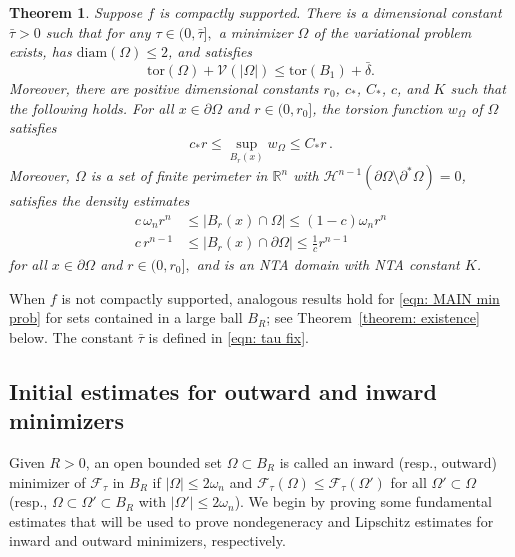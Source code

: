 \documentclass[10pt, reqno]{amsart}
\numberwithin{equation}{section}
\newtheorem{theorem}{Theorem}[section]
\def\R{{\mathbb R}}
\def\W{\Omega}
\def\om{\omega}
\def\tor{\mathrm{tor}}
\def\fvbar{\mathscr{V}}
\def\err{\tau}
\def\Ep{\mathcal{F}_{\err}}
\def\pa{{\partial}}
\def\ccdel{\bar{\delta}}
\begin{document}
%
%
%
%
%

\begin{theorem}\label{thm: existence 2} \label{prop: basic properties}
 Suppose  $f$ is compactly supported. There is a dimensional constant $\bar{\tau}>0$  such that for any $\tau \in (0,\bar{\tau}],$  a  minimizer $\W$ of the variational problem 
	exists, has $\text{diam}(\W) \leq 2$, and satisfies 
     \begin{equation}\label{eqn: low base energy main 2}
    \tor(\W) + \fvbar(|\W|) \leq \tor(B_1)+\ccdel.
\end{equation}
Moreover, there are positive dimensional constants $r_0$, $c_*$, $C_*$, $c$, and $K$ such that the following holds.
For all $x \in \partial \W$ and $r \in (0,r_0]$, the torsion function $w_\W$ of $\W$ satisfies 
    \begin{equation}\label{eqn: NDandLip}
      c_*r \leq \sup_{B_r(x)} w_\W \leq C_* r  \,.
    \end{equation}
Moreover, $\W$ is a set of finite perimeter in $\R^n$ with $\mathcal{H}^{n-1}(\partial \W \setminus \partial^*\W) =0$, satisfies the density estimates 
\begin{align}\label{eqn: volume density}
    c\, \om_nr^n & \leq |B_r(x) \cap \W| \leq (1-c)\om_n r^n\\
    \label{eqn: perim density}
    c\, r^{n-1} & \leq |B_r(x) \cap \pa \W| \leq \frac{1}{c}r^{n-1} 
\end{align}
for all $x \in \partial \W$ and $r \in (0,r_0],$ and is an NTA domain with NTA constant $K$.



\end{theorem}
 When $f$ is not compactly supported, analogous results hold for \eqref{eqn: MAIN min prob} for sets contained in a large ball $B_R$; see Theorem~\ref{theorem: existence} below.
The constant $ \bar{\tau}$ is defined in \eqref{eqn: tau fix}.



\subsection{Initial estimates for outward and inward minimizers}
Given $R>0$, an open bounded set $\W\subset B_R$ is called an inward (resp., outward) minimizer of $\Ep$ in $B_R$ if $|\W| \leq 2 \omega_n $
and $\Ep(\W) \leq \Ep(\W')$ for all $\W'\subset \W$ (resp., $\W\subset \W'\subset B_R$ with $|\W'|\leq 2 \om_n$).
We begin by proving some fundamental estimates that will be used to prove nondegeneracy and Lipschitz estimates for inward and outward minimizers, respectively. 
\end{document}
